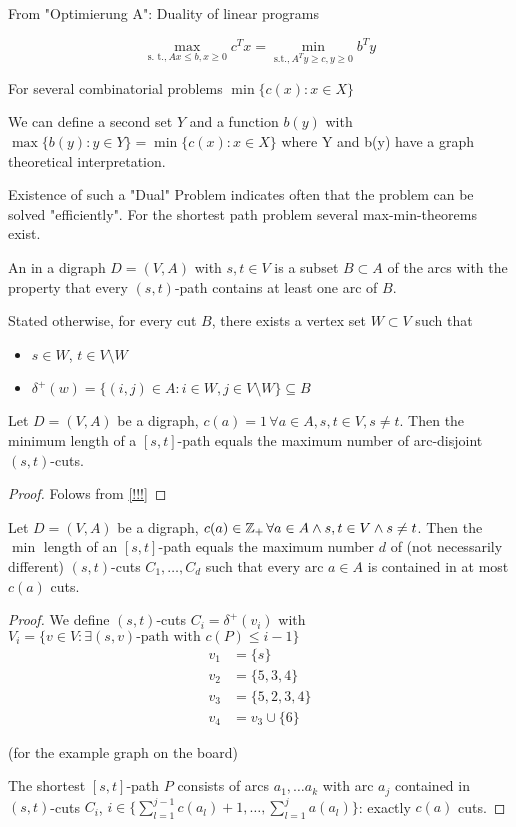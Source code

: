 From "Optimierung A": Duality of linear programs

\[\max_{\text{s. t.}, Ax \leq b, x \geq 0} c^Tx = \min_{\text{s.t.}, A^T y \geq c, y \geq 0} b^T y\]

For several combinatorial problems $\min\{c(x): x \in X\}$

We can define a second set $Y$ and a function $b(y)$ with $\max\{b(y): y \in Y \} = \min \{ c(x): x \in X\}$ where Y and b(y) have a graph theoretical interpretation. 

Existence of such a "Dual" Problem indicates often that the problem can be solved "efficiently". For the shortest path problem several max-min-theorems exist.

\begin{defn}
An  in a digraph $D=(V,A)$ with $s,t \in V$ is a subset $B \subset A$ of the arcs with the property that every $(s,t)$-path contains at least one arc of $B$.

Stated  otherwise, for every cut $B$, there exists a vertex set $W \subset V$ such that
\begin{itemize}
	\item $s \in W$, $t \in V \setminus W$
	\item $\delta^+(w) = \{(i,j) \in A: i \in W, j \in V \setminus W\} \subseteq B$
\end{itemize}
\end{defn}

\begin{thm}
	Let $D=(V,A)$ be a digraph, $c(a)=1 \, \forall a \in A, s,t \in V, s \neq t$. Then the minimum length of a $[s,t]$-path equals the maximum number of arc-disjoint $(s,t)$-cuts. 
\end{thm}

\begin{proof}
	Folows from \ref{!!!} %
\end{proof}

\begin{thm} %
	Let $D=(V,A)$ be a digraph, $c(a) \in \mathbb{Z}_+ \, \forall a \in A \wedge s,t \in V \wedge s\neq t$. Then the $\min$ length of an $[s,t]$-path equals the maximum number $d$ of (not necessarily different) $(s,t)$-cuts $C_1, …, C_d$ such that every arc $a \in A$ is contained in at most $c(a)$ cuts.
\end{thm}

\begin{proof}
	We define $(s, t)$-cuts $C_i = \delta^+(v_i)$ with $V_i=\{v \in V: \exists \text{$(s,v)$-path with $c(P)\leq i-1$}\}$
	\begin{align*}
		v_1 & = \{s\} \\
		v_2 & = \{5,3,4\} \\
		v_3 & = \{5,2,3,4\} \\
		v_4 & = v_3 \cup \{ 6 \}
	\end{align*}
	
	(for the example graph on the board)
	
	The shortest $[s,t]$-path $P$ consists of arcs $a_1, … a_k$ with arc $a_j$ contained in $(s,t)$-cuts $C_i$,  $i \in \{\sum_{l=1}^{j-1} c(a_l) + 1, …, \sum_{l=1}^j a(a_l)\}$: exactly $c(a)$ cuts.
\end{proof}	
